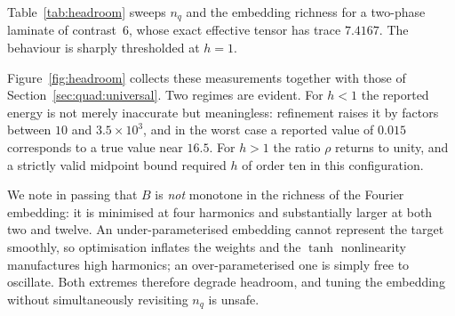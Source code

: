 Table~\ref{tab:headroom} sweeps $n_q$ and the embedding richness for a
two-phase laminate of contrast~$6$, whose exact effective tensor has trace
$7.4167$. The behaviour is sharply thresholded at $h = 1$.

\begin{table}[t]
\centering
\caption{Headroom governs the reliability of a collocation-trained energy.
Laminate, contrast~6, width~48, depth~3, $400$ steps. ``Reported'' is the
energy at the training rule; ``refined'' at $4n_q$. Exact trace $7.4167$.}
\label{tab:headroom}

\end{table}

Figure~\ref{fig:headroom} collects these measurements together with
those of Section~\ref{sec:quad:universal}. Two regimes are evident. For $h < 1$ the reported energy is not merely
inaccurate but meaningless: refinement raises it by factors between $10$
and $3.5\times 10^{3}$, and in the worst case a reported value of $0.015$
corresponds to a true value near $16.5$. For $h > 1$ the ratio $\rho$
returns to unity, and a strictly valid midpoint bound required $h$ of order
ten in this configuration.

We note in passing that $B$ is \emph{not} monotone in the richness of the
Fourier embedding: it is minimised at four harmonics and substantially
larger at both two and twelve. An under-parameterised embedding cannot
represent the target smoothly, so optimisation inflates the weights and the
$\tanh$ nonlinearity manufactures high harmonics; an over-parameterised one
is simply free to oscillate. Both extremes therefore degrade headroom, and
tuning the embedding without simultaneously revisiting $n_q$ is unsafe.


